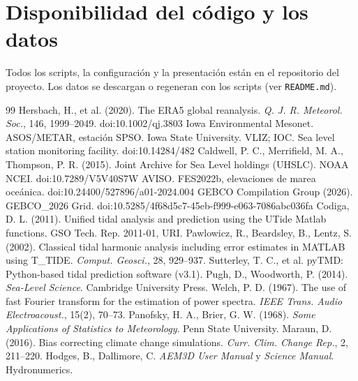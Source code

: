 \documentclass[11pt,a4paper]{article}
\begin{document}
\section*{Disponibilidad del código y los datos}
Todos los scripts, la configuración y la presentación están en el repositorio del proyecto. Los datos se
descargan o regeneran con los scripts (ver \texttt{README.md}).

\begin{thebibliography}{99}
\small
{} Hersbach, H., et al. (2020). The ERA5 global reanalysis. \emph{Q. J. R. Meteorol. Soc.}, 146, 1999--2049. doi:10.1002/qj.3803
 Iowa Environmental Mesonet. ASOS/METAR, estación SPSO. Iowa State University.
 VLIZ; IOC. Sea level station monitoring facility. doi:10.14284/482
 Caldwell, P. C., Merrifield, M. A., Thompson, P. R. (2015). Joint Archive for Sea Level holdings (UHSLC). NOAA NCEI. doi:10.7289/V5V40S7W
 AVISO. FES2022b, elevaciones de marea oceánica. doi:10.24400/527896/a01-2024.004
 GEBCO Compilation Group (2026). GEBCO\_2026 Grid. doi:10.5285/4f68d5c7-45eb-f999-e063-7086abc036fa
 Codiga, D. L. (2011). Unified tidal analysis and prediction using the UTide Matlab functions. GSO Tech. Rep. 2011-01, URI.
 Pawlowicz, R., Beardsley, B., Lentz, S. (2002). Classical tidal harmonic analysis including error estimates in MATLAB using T\_TIDE. \emph{Comput. Geosci.}, 28, 929--937.
 Sutterley, T. C., et al. pyTMD: Python-based tidal prediction software (v3.1).
 Pugh, D., Woodworth, P. (2014). \emph{Sea-Level Science}. Cambridge University Press.
 Welch, P. D. (1967). The use of fast Fourier transform for the estimation of power spectra. \emph{IEEE Trans. Audio Electroacoust.}, 15(2), 70--73.
 Panofsky, H. A., Brier, G. W. (1968). \emph{Some Applications of Statistics to Meteorology}. Penn State University.
 Maraun, D. (2016). Bias correcting climate change simulations. \emph{Curr. Clim. Change Rep.}, 2, 211--220.
 Hodges, B., Dallimore, C. \emph{AEM3D User Manual} y \emph{Science Manual}. Hydronumerics.
\end{thebibliography}
\end{document}
